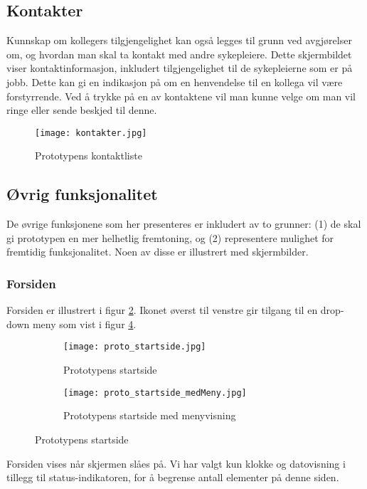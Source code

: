 \subsection{Kontakter}
Kunnskap om kollegers tilgjengelighet kan også legges til grunn ved avgjørelser om, og hvordan man skal ta kontakt med andre sykepleiere. Dette skjermbildet viser kontaktinformasjon, inkludert tilgjengelighet til de sykepleierne som er på jobb. Dette kan gi en indikasjon på om en henvendelse til en kollega vil være forstyrrende. Ved å trykke på en av kontaktene vil man kunne velge om man vil ringe eller sende beskjed til denne.

\begin{figure}[H]
\centering
	\texttt{[image: kontakter.jpg]}
	\caption{Prototypens kontaktliste}
	\label{kontakter}
\end{figure}

\subsection{Øvrig funksjonalitet}
De øvrige funksjonene som her presenteres er inkludert av to grunner: (1) de skal gi prototypen en mer helhetlig fremtoning, og (2) representere mulighet for fremtidig funksjonalitet. Noen av disse er illustrert med skjermbilder.

\subsubsection{Forsiden}
Forsiden er illustrert i figur \ref{proto_startside}. Ikonet øverst til venstre gir tilgang til en drop-down meny som vist i figur \ref{proto_startside_medMeny}. 

\begin{figure}[H]
	\centering
	\begin{subfigure}[b]{0.48\textwidth}
		\texttt{[image: proto\_startside.jpg]}
		\caption{Prototypens startside}
		\label{proto_startside}
	\end{subfigure}
	\begin{subfigure}[b]{0.48\textwidth}
		\texttt{[image: proto\_startside\_medMeny.jpg]}
		\caption{Prototypens startside med menyvisning}
		\label{proto_startside_medMeny}
	\end{subfigure}
	\caption{Prototypens startside}
\end{figure}

\noindent
Forsiden vises når skjermen slåes på. Vi har valgt kun klokke og datovisning i tillegg til status-indikatoren, for å begrense antall elementer på denne siden.

